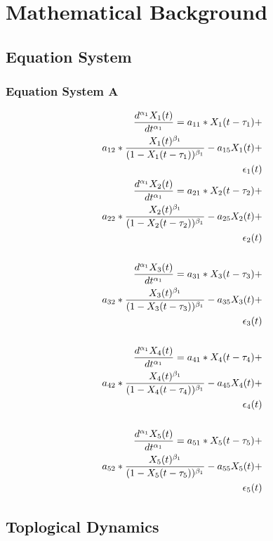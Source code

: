\section{Mathematical Background}

\subsection{Equation System}

\subsubsection{Equation System A}

\begin{align*} 
\tiny
\frac{d^{\alpha_1}X_1(t)}{dt^{\alpha_1}} = a_{11} *X_1(t - \tau_1) + \\
a_{12} *\frac{X_1(t)^{\beta_1}}{(1-X_1(t - \tau_1))^{\beta_1}} - a_{15}X_1(t) + \\
\epsilon_1(t) \\
\frac{d^{\alpha_1}X_2(t)}{dt^{\alpha_1}} = a_{21} *X_2(t - \tau_2) + \\
a_{22} *\frac{X_2(t)^{\beta_1}}{(1-X_2(t - \tau_2))^{\beta_1}} - a_{25}X_2(t) + \\
\epsilon_2(t) \\ \\
\frac{d^{\alpha_1}X_3(t)}{dt^{\alpha_1}} = a_{31} *X_3(t - \tau_3) + \\
a_{32} *\frac{X_3(t)^{\beta_1}}{(1-X_3(t - \tau_3))^{\beta_1}} - a_{35}X_3(t) + \\
\epsilon_3(t) \\ \\
\frac{d^{\alpha_1}X_4(t)}{dt^{\alpha_1}} = a_{41} *X_4(t - \tau_4) + \\
a_{42} *\frac{X_4(t)^{\beta_1}}{(1-X_4(t - \tau_4))^{\beta_1}} - a_{45}X_4(t) + \\
\epsilon_4(t) \\ \\
\frac{d^{\alpha_1}X_5(t)}{dt^{\alpha_1}} = a_{51} *X_5(t - \tau_5) + \\
a_{52} *\frac{X_5(t)^{\beta_1}}{(1-X_5(t - \tau_5))^{\beta_1}} - a_{55}X_5(t) + \\
\epsilon_5(t) \\
\end{align*}



\subsection{Toplogical Dynamics}

